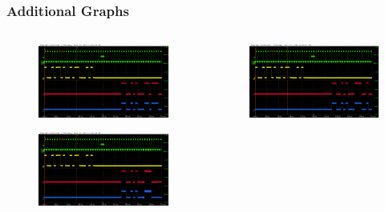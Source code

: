 \documentclass[aspectratio=169]{beamer}
\begin{document}
	\begin{frame}[noframenumbering]
	\frametitle{Additional Graphs}
	\begin{columns}
		\begin{center}
			\begin{figure}
				\includegraphics[width=0.95 \textwidth]{IMG/probe/09-08-2021_ch05-read55-baselinedac1.png}
				\caption{}
			\end{figure}
			\begin{figure}
				\includegraphics[width=0.95 \textwidth]{IMG/probe/09-08-2021_ch05-read56-baselinedac1.png}
				\caption{}
			\end{figure}		
		\end{center}
		\begin{center}
			\begin{figure}
				\includegraphics[width=0.95 \textwidth]{IMG/probe/09-08-2021_ch05-read57-baselinedac1.png}

\end{figure}
\end{center}
\end{columns}
\end{frame}
\end{document}
